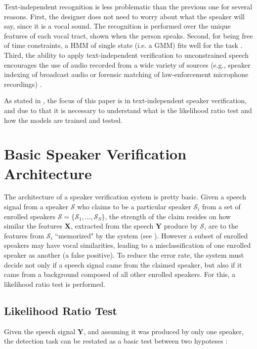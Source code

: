 Text-independent recognition is less problematic than the previous one for several reasons. First, the designer does not need to worry about what the speaker will say, since it is a vocal sound. The recognition is performed over the unique features of each vocal tract, shown when the person speaks. Second, for being free of time constraints, a HMM of single state (i.e. a GMM) fits well for the task . Third, the ability to apply text-independent verification to unconstrained speech encourages the use of audio recorded from a wide variety of sources (e.g., speaker indexing of broadcast audio or forensic matching of law-enforcement microphone recordings) .

As stated in , the focus of this paper is in text-independent speaker verification, and due to that it is necessary to understand what is the likelihood ratio test and how the models are trained and tested.

\section{Basic Speaker Verification Architecture}

The architecture of a speaker verification system is pretty basic. Given a speech signal from a speaker $\mathcal{S}$ who claims to be a particular speaker $\mathcal{S}_i$ from a set of enrolled speakers $\boldsymbol{\mathcal{S}} = \{\mathcal{S}_1, ..., \mathcal{S}_S\}$, the strength of the claim resides on how similar the features $\boldsymbol{X}$, extracted from the speech $\boldsymbol{Y}$ produce by $\mathcal{S}$, are to the features from $\mathcal{S}_i$ ``memorized" by the system (see ). However a subset of enrolled speakers may have vocal similarities, leading to a misclassification of one enrolled speaker as another (a false positive). To reduce the error rate, the system must decide not only if a speech signal came from the claimed speaker, but also if it came from a background composed of all other enrolled speakers. For this, a likelihood ratio test is performed.

\subsection{Likelihood Ratio Test}

Given the speech signal $\boldsymbol{Y}$, and assuming it was produced by only one speaker, the detection task can be restated as a basic test between two hypoteses :

